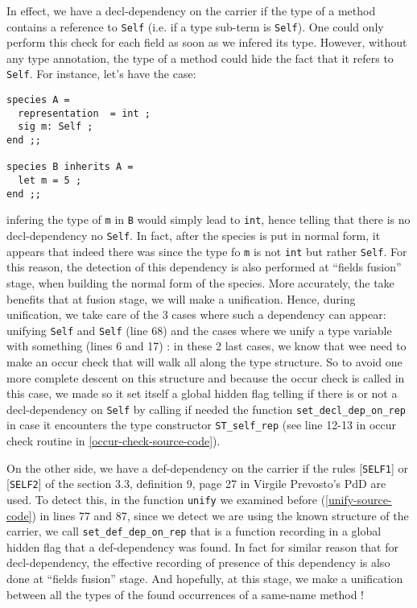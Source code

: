 In effect, we have a decl-dependency on the carrier if the type of a
method contains a reference to {\tt Self} (i.e. if a type sub-term is
{\tt Self}). One could only perform this check for each field as soon
as we infered its type. However, without any type annotation, the type
of a method could hide the fact that it refers to {\tt Self}. For
instance, let's have the case:
{\footnotesize
\begin{lstlisting}
species A =
  representation  = int ;
  sig m: Self ;
end ;;

species B inherits A =
  let m = 5 ;
end ;;
\end{lstlisting}
}

\noindent infering the type of {\tt m} in {\tt B} would simply lead to
{\tt int}, hence telling that there is no decl-dependency no
{\tt Self}. In fact, after the species is put in normal form, it
appears that indeed there was since the type fo {\tt m} is not
{\tt int} but rather {\tt Self}. For this reason, the detection of
this dependency is also performed at ``fields fusion'' stage, when
building the normal form of the species. More accurately, the take
benefits that at fusion stage, we will make a unification. Hence,
during unification, we take care of the 3 cases where such a
dependency can appear: unifying {\tt Self} and {\tt Self} (line 68)
and the cases where we unify a type variable with something (lines 6
and 17) : in these 2 last cases, we know that wee need to make an
occur check that will walk all along the type structure. So to avoid
one more complete descent on this structure and because the occur
check is called in this case, we made so it set itself a global hidden
flag telling if there is or not a decl-dependency on {\tt Self} by
calling if needed the function {\tt set\_decl\_dep\_on\_rep} in case
it encounters the type constructor {\tt ST\_self\_rep} (see line 12-13
in occur check routine in \ref{occur-check-source-code}).

\medskip
On the other side, we have a def-dependency on the carrier if the
rules [{\tt SELF1}] or [{\tt SELF2}] of the section 3.3, definition 9,
page 27 in Virgile Prevosto's PdD are used. To detect this, in
the function {\tt unify} we examined before (\ref{unify-source-code})
in lines 77 and 87, since we detect we are using the known structure
of the carrier, we call {\tt set\_def\_dep\_on\_rep} that is a
function recording in a global hidden flag that a def-dependency was
found. In fact for similar reason that for decl-dependency, the
effective recording of presence of this dependency is also done at 
``fields fusion'' stage. And hopefully, at this stage, we make a
unification between all the types of the found occurrences of a
same-name method !

